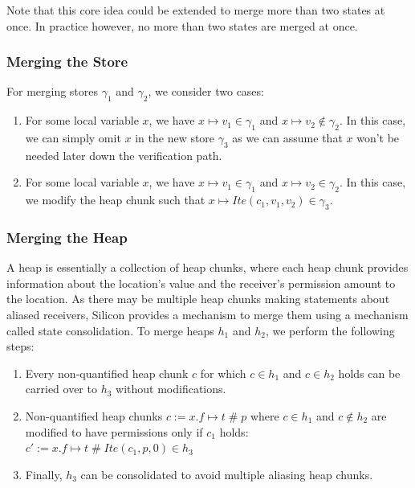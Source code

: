 \documentclass[11pt]{article}
\DeclareMathOperator{\perm}{\mathbin{\#}}
\begin{document}
    Note that this core idea could be extended to merge more than two states at once. In practice however,
    no more than two states are merged at once.

    \subsubsection{Merging the Store}

    For merging stores $\gamma_1$ and $\gamma_2$, we consider two cases:

    \begin{enumerate}
        \item For some local variable $x$, we have $x \mapsto v_1 \in \gamma_1$ and $x \mapsto v_2 \notin \gamma_2$.
            In this case, we can simply omit $x$ in the new store $\gamma_3$ as we can assume that $x$ won't
            be needed later down the verification path.
        \item For some local variable $x$, we have $x \mapsto v_1 \in \gamma_1$ and $x \mapsto v_2 \in \gamma_2$.
            In this case, we modify the heap chunk such that $x \mapsto Ite(c_1, v_1, v_2) \in \gamma_3$.
    \end{enumerate}

    \subsubsection{Merging the Heap}

    A heap is essentially a collection of heap chunks, where each heap chunk provides information
    about the location's value and the receiver's permission amount to the location.
    As there may be multiple heap chunks making statements about aliased receivers,
    Silicon provides a mechanism to merge them using a mechanism called state consolidation.
    To merge heaps $h_1$ and $h_2$, we perform the following steps:

    \begin{enumerate}
        \item Every non-quantified heap chunk $c$ for which $c \in h_1$ and $c \in h_2$ holds can be carried over to $h_3$
            without modifications.
        \item Non-quantified heap chunks $c := x.f \mapsto t \perm p$ where $c \in h_1$ and $c \notin h_2$ are modified to
            have permissions only if $c_1$ holds: $c' := x.f \mapsto t \perm Ite(c_1, p, 0) \in h_3$
        \item Finally, $h_3$ can be consolidated to avoid multiple aliasing heap chunks.
    \end{enumerate}
\end{document}
